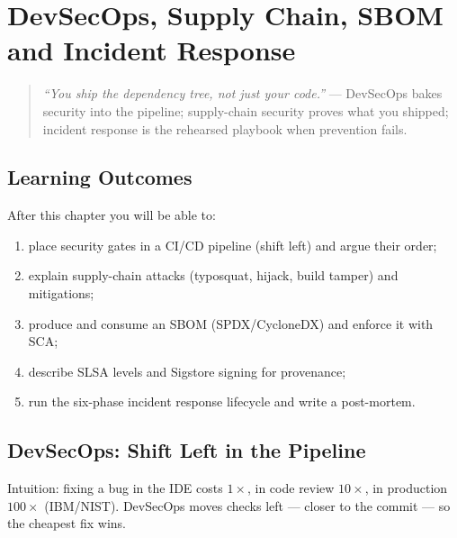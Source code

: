 \chapter{DevSecOps, Supply Chain, SBOM and Incident Response}
\label{ch:devsecops}

\begin{quote}
\emph{``You ship the dependency tree, not just your code.''} --- DevSecOps bakes security into the pipeline; supply-chain security proves what you shipped; incident response is the rehearsed playbook when prevention fails.
\end{quote}

\noindent{}
\vspace{0.4em}

\section*{Learning Outcomes}
After this chapter you will be able to:
\begin{enumerate}[label=(L\arabic*)]
    \item place security gates in a CI/CD pipeline (shift left) and argue their order;
    \item explain supply-chain attacks (typosquat, hijack, build tamper) and mitigations;
    \item produce and consume an SBOM (SPDX/CycloneDX) and enforce it with SCA;
    \item describe SLSA levels and Sigstore signing for provenance;
    \item run the six-phase incident response lifecycle and write a post-mortem.
\end{enumerate}

\section{DevSecOps: Shift Left in the Pipeline}
\label{sec:devsecops}
Intuition: fixing a bug in the IDE costs $1\times$, in code review $10\times$, in production $100\times$ (IBM/NIST). DevSecOps moves checks left --- closer to the commit --- so the cheapest fix wins.

